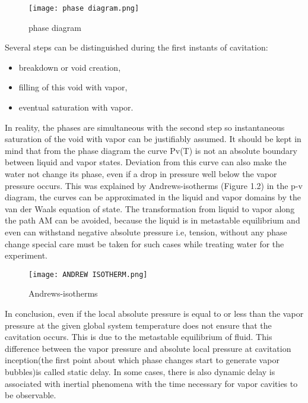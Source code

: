 \begin{figure}[H]
    \centering
    \texttt{[image: phase diagram.png]}
    \caption{phase diagram}
    \label{fig:fig1}
\end{figure}

 
Several steps can be distinguished during the first instants of
cavitation:

\begin{itemize}
  \item breakdown or void creation,
  \item filling of this void with vapor,
  \item eventual saturation with vapor.
\end {itemize}

In reality, the phases are simultaneous with the second step so
instantaneous saturation of the void with vapor can be justifiably
assumed. It should be kept in mind that from the phase diagram the
curve Pv(T) is not an absolute boundary between liquid and vapor
states. Deviation from this curve can also make the water not change
its phase, even if a drop in pressure well below the vapor pressure
occurs. This was explained by Andrews-isotherms (Figure 1.2) in the
p-v diagram, the curves can be approximated in the liquid and vapor
domains by the van der Waals equation of state. The transformation
from liquid to vapor along the path AM can be avoided, because the
liquid is in metastable equilibrium and even can withstand negative
absolute pressure i.e, tension, without any phase change special care
must be taken for such cases while treating water for the
experiment.\\

\begin{figure}[H]
    \centering
    \texttt{[image: ANDREW ISOTHERM.png]}
    \caption{Andrews-isotherms}
    \label{fig:fig2}
\end{figure}

In conclusion, even if the local absolute pressure is equal to or less
than the vapor pressure at the given global system temperature does
not ensure that the cavitation occurs. This is due to the metastable
equilibrium of fluid. This difference between the vapor pressure and
absolute local pressure at cavitation inception(the first point about
which phase changes start to generate vapor bubbles)is called static
delay. In some cases, there is also dynamic delay is associated with
inertial phenomena with the time necessary for vapor cavities to be
observable.\\

